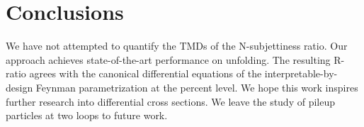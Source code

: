 \section{Conclusions}\label{sec:conclusions}

We have not attempted to quantify the TMDs of the N-subjettiness ratio.
Our approach achieves state-of-the-art performance on unfolding. The
resulting R-ratio agrees with the canonical differential equations of
the interpretable-by-design Feynman parametrization at the percent
level. We hope this work inspires further research into differential
cross sections. We leave the study of pileup particles at two loops to
future work.

